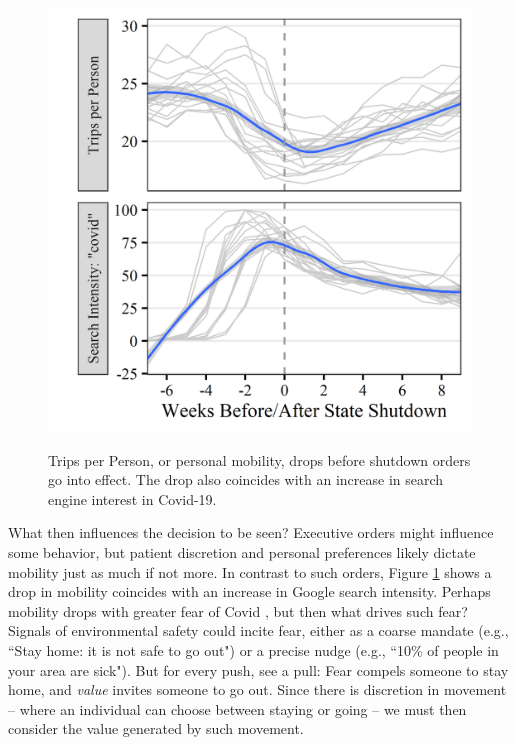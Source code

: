  \begin{figure}[!b]
    \centering
    \caption{Trips per Person, or personal mobility, drops before shutdown orders go into effect. The drop also coincides with an increase in search engine interest in Covid-19.}
    \includegraphics[scale=1]{Figures/VC2/MotFig-Take2.png}     
    \label{fig:t2_mot_fig}
 \end{figure}  
 
 What then influences the decision to be seen? Executive orders might influence some behavior, but patient discretion and personal preferences likely dictate mobility just as much if not more. In contrast to such orders, Figure \ref{fig:t2_mot_fig} shows a drop in mobility coincides with an increase in Google search intensity. Perhaps mobility drops with greater fear of Covid \citep{Alfaro2020}, but then what drives such fear? Signals of environmental safety could incite fear, either as a coarse mandate (e.g., “Stay home: it is not safe to go out") or a precise nudge (e.g., “10\% of people in your area are sick"). But for every push, see a pull: Fear compels someone to stay home, and \textit{value} invites someone to go out. Since there is discretion in movement -- where an individual can choose between staying or going -- we must then consider the value generated by such movement.
 
